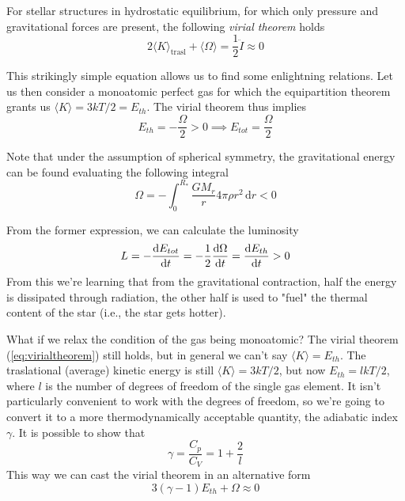 For stellar structures in hydrostatic equilibrium, for which only pressure and gravitational forces are present, the following \emph{virial theorem} holds
\begin{equation}
	2\langle K \rangle_{\text{trasl}} + \langle \Omega \rangle = \frac{1}{2}\ddot{I} \approx 0
	\label{eq:virialtheorem}
\end{equation}
\par This strikingly simple equation allows us to find some enlightning relations. Let us then consider a monoatomic perfect gas for which the equipartition theorem grants us $\langle K \rangle = 3kT/2 = E_{th}$. The virial theorem thus implies
\begin{equation*}
	E_{th} = -\frac{\Omega}{2} > 0 \implies E_{tot} = \frac{\Omega}{2}
\end{equation*}
\par Note that under the assumption of spherical symmetry, the gravitational energy can be found evaluating the following integral
\begin{equation*}
	\Omega = -\int_{0}^{R_{*}}\frac{GM_{r}}{r}4\pi\rho r^{2}\,\text{d}r < 0
\end{equation*}
\par From the former expression, we can calculate the luminosity
\begin{equation*}
	L = -\frac{\text{d}E_{tot}}{\text{d}t} = -\frac{1}{2}\frac{\text{d}\Omega}{\text{d}t} = \frac{\text{d}E_{th}}{\text{d}t} > 0
\end{equation*}
From this we're learning that from the gravitational contraction, half the energy is dissipated through radiation, the other half is used to "fuel" the thermal content of the star (i.e., the star gets hotter).
\par What if we relax the condition of the gas being monoatomic? The virial theorem (\ref{eq:virialtheorem}) still holds, but in general we can't say $\langle K \rangle = E_{th}$. The traslational (average) kinetic energy is still $\langle K \rangle = 3kT/2$, but now $E_{th} = l kT/2$, where $l$ is the number of degrees of freedom of the single gas element. It isn't particularly convenient to work with the degrees of freedom, so we're going to convert it to a more thermodynamically acceptable quantity, the adiabatic index $\gamma$. It is possible to show that
\begin{equation*}
	\gamma = \frac{C_{p}}{C_{V}} = 1 + \frac{2}{l}
\end{equation*}
This way we can cast the virial theorem in an alternative form
\begin{equation*}
	3(\gamma -1)E_{th} + \Omega \approx 0
\end{equation*}
